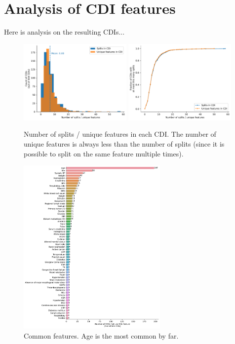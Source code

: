 \documentclass[10pt]{article}
\begin{document}
\section{Analysis of CDI features}

Here is analysis on the resulting CDIs...

\begin{figure}[H]
    \centering
    \includegraphics[width=0.49\textwidth]{../results/num_rules_hist.pdf}
    \includegraphics[width=0.49\textwidth]{../results/num_rules_cdf.pdf}
    \caption{Number of splits / unique features in each CDI.
    The number of unique features is always less than the number of splits (since it is possible to split on the same feature multiple times).}
\end{figure}

\begin{figure}[H]
    \centering
    \includegraphics[width=0.65\textwidth]{../results/common_features.pdf}
    \caption{Common features. Age is the most common by far.}
\end{figure}
\end{document}
